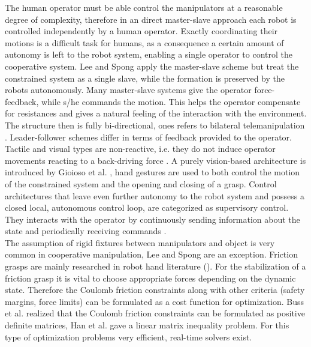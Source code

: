 \documentclass[a4paper,twoside, openright,12pt]{report}
\begin{document}
The human operator must be able control the manipulators at a reasonable degree of complexity, therefore in an direct master-slave approach each robot is controlled independently by a human operator. Exactly coordinating their motions is a difficult task for humans, as a consequence a certain amount of autonomy is left to the robot system, enabling a single operator to control the cooperative system. Lee and Spong \cite{Lee_05} apply the master-slave scheme but treat the constrained system as a single slave, while the formation is preserved by the robots autonomously. Many master-slave systems give the operator force-feedback, while s/he commands the motion. This helps the operator compensate for resistances and gives a natural feeling of the interaction with the environment. The structure then is fully bi-directional, ones refers to bilateral telemanipulation \cite{TeleoperationHandbook}. Leader-follower \cite{Sieber_15,Scheggi_14} schemes differ in terms of feedback provided to the operator. Tactile and visual types are non-reactive, i.e. they do not induce operator movements reacting to a back-driving force \cite{Massimino_93}. A purely vision-based architecture is introduced by Gioioso et al. \cite{Gioioso_2014}, hand gestures are used to both control the motion of the constrained system and the opening and closing of a grasp. Control architectures that leave even further autonomy to the robot system and possess a closed local, autonomous control loop, are categorized as supervisory control. They interacts with the operator by continuously sending information about the state and periodically receiving commands \cite{Sheridian_92}.\\
The assumption of rigid fixtures between manipulators and object is very common in cooperative manipulation, Lee and Spong \cite{Lee_05} are an exception. Friction grasps are mainly researched in robot hand literature (\cite{Wimboeck_06,Wimboeck_08,Stramigioli_01}). For the stabilization of a friction grasp it is vital to choose appropriate forces depending on the dynamic state. Therefore the Coulomb friction constraints along with other criteria (safety margins, force limits) can be formulated as a cost function for optimization. Buss et al. \cite{Buss_96} realized that the Coulomb friction constraints can be formulated as positive definite matrices, Han et al. \cite{Han_2000} gave a linear matrix inequality problem. For this type of optimization problems very efficient, real-time solvers exist.
\\
\end{document}
